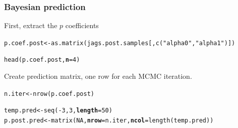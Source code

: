 \documentclass[color=usenames,dvipsnames]{beamer}\usepackage[]{graphicx}\usepackage[]{xcolor}
\makeatletter
\newcommand{\hlnum}[1]{\textcolor[rgb]{0.69,0.494,0}{#1}}%
\newcommand{\hlsng}[1]{\textcolor[rgb]{0.749,0.012,0.012}{#1}}%
\newcommand{\hlopt}[1]{\textcolor[rgb]{0,0,0}{#1}}%
\newcommand{\hldef}[1]{\textcolor[rgb]{0,0,0}{#1}}%
\newcommand{\hlkwb}[1]{\textcolor[rgb]{0,0.341,0.682}{#1}}%
\newcommand{\hlkwc}[1]{\textcolor[rgb]{0,0,0}{\textbf{#1}}}%
\newcommand{\hlkwd}[1]{\textcolor[rgb]{0.004,0.004,0.506}{#1}}%
\newenvironment{kframe}{%
 \def\at@end@of@kframe{}%
 \ifinner\ifhmode%
  \def\at@end@of@kframe{\end{minipage}}%
  \begin{minipage}{\columnwidth}%
 \fi\fi%
 \def\FrameCommand##1{\hskip\@totalleftmargin \hskip-\fboxsep
 \colorbox{shadecolor}{##1}\hskip-\fboxsep
     \hskip-\linewidth \hskip-\@totalleftmargin \hskip\columnwidth}%
 \MakeFramed {\advance\hsize-\width
   \@totalleftmargin\z@ \linewidth\hsize
   \@setminipage}}%
 {\par\unskip\endMakeFramed%
 \at@end@of@kframe}
\newenvironment{knitrout}{}{} %
\makeatother
\begin{document}
\begin{frame}[fragile]
  \frametitle{Bayesian prediction}
  \small
  First, extract the $p$ coefficients
  \vspace{-6pt}
\begin{knitrout}\scriptsize
{}\color{fgcolor}\begin{kframe}
\begin{alltt}
\hldef{p.coef.post} \hlkwb{<-} \hlkwd{as.matrix}\hldef{(jags.post.samples[,}\hlkwd{c}\hldef{(}\hlsng{"alpha0"}\hldef{,}\hlsng{"alpha1"}\hldef{)])}
\end{alltt}


{\ttfamily\noindent\bfseries{}}\begin{alltt}
\hlkwd{head}\hldef{(p.coef.post,} \hlkwc{n}\hldef{=}\hlnum{4}\hldef{)}
\end{alltt}


{\ttfamily\noindent\bfseries\color{errorcolor}{\#\# Error in h(simpleError(msg, call)): error in evaluating the argument 'x' in selecting a method for function 'head': object 'p.coef.post' not found}}\end{kframe}
\end{knitrout}
  \pause
  \vfill
  Create prediction matrix, one row for each MCMC iteration.
  \vspace{-6pt}
\begin{knitrout}\scriptsize
{}\color{fgcolor}\begin{kframe}
\begin{alltt}
\hldef{n.iter} \hlkwb{<-} \hlkwd{nrow}\hldef{(p.coef.post)}
\end{alltt}


{\ttfamily\noindent\bfseries\color{errorcolor}{\#\# Error: object 'p.coef.post' not found}}\begin{alltt}
\hldef{temp.pred} \hlkwb{<-} \hlkwd{seq}\hldef{(}\hlopt{-}\hlnum{3}\hldef{,} \hlnum{3}\hldef{,} \hlkwc{length}\hldef{=}\hlnum{50}\hldef{)}
\hldef{p.post.pred} \hlkwb{<-} \hlkwd{matrix}\hldef{(}\hlnum{NA}\hldef{,} \hlkwc{nrow}\hldef{=n.iter,} \hlkwc{ncol}\hldef{=}\hlkwd{length}\hldef{(temp.pred))}
\end{alltt}



\end{kframe}
\end{knitrout}
\end{frame}
\end{document}
